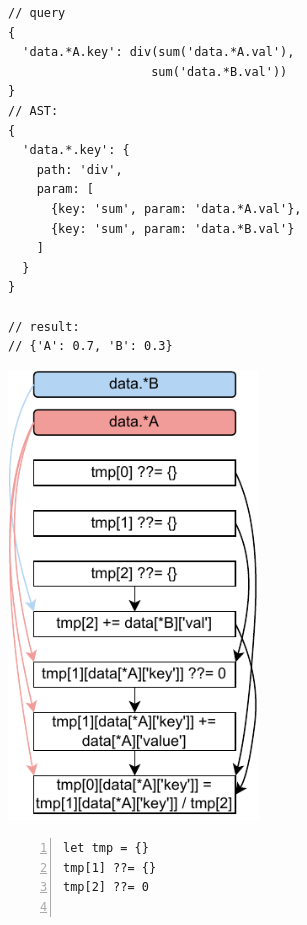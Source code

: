 \documentclass[runningheads]{llncs}
\begin{document}
\begin{figure}[t!]
\begin{subfigure}{\textwidth}
\begin{minipage}{0.33\textwidth}
\begin{lstlisting}[style=JavaScriptTiny, columns=flexible]
// query
{
  'data.*A.key': div(sum('data.*A.val'), 
                    sum('data.*B.val')) 
}
// AST:
{
  'data.*.key': {
    path: 'div',
    param: [
      {key: 'sum', param: 'data.*A.val'},
      {key: 'sum', param: 'data.*B.val'}
    ]
  }
}

// result:
// {'A': 0.7, 'B': 0.3}
\end{lstlisting}
\end{minipage}
\begin{minipage}{0.27\textwidth}
\centering
\includegraphics[width=0.73\textwidth]{images/intro_q3_ir.pdf}
\end{minipage}
\begin{minipage}{0.4\textwidth}
\begin{lstlisting}[style=JavaScriptTiny, columns=flexible, numbers=left, xleftmargin=2pt]
let tmp = {}
tmp[1] ??= {}
tmp[2] ??= 0


\end{lstlisting}
\end{minipage}
\end{subfigure}
\end{figure}
\end{document}
